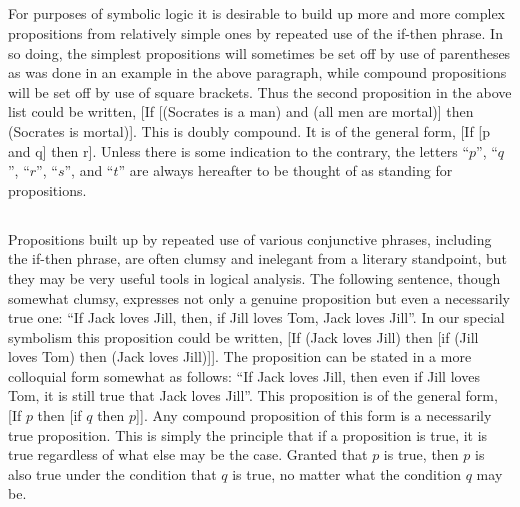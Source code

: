 \documentclass{book}
\begin{document}
\subsection{}
\label{sec:3.3}

For purposes of symbolic logic it is desirable to build up more and more complex propositions from relatively simple ones by repeated use of the if-then phrase.  In so doing, the simplest propositions will sometimes be set off by use of parentheses as was done in an example in the above paragraph, while compound propositions will be set off by use of square brackets.  Thus the second proposition in the above list could be written, [If [(Socrates is a man) and (all men are mortal)] then (Socrates is mortal)].  This is doubly compound.  It is of the general form, [If [p and q] then r].  Unless there is some indication to the contrary, the letters “\(p\)”, “\(q\)”, “\(r\)”, “\(s\)”, and “\(t\)” are always hereafter to be thought of as standing for propositions.

\subsection{}
\label{sec:3.4}

Propositions built up by repeated use of various conjunctive phrases, including the if-then phrase, are often clumsy and inelegant from a literary standpoint, but they may be very useful tools in logical analysis.  The following sentence, though somewhat clumsy, expresses not only a genuine proposition but even a necessarily true one: “If Jack loves Jill, then, if Jill loves Tom, Jack loves Jill”.  In our special symbolism this proposition could be written, [If (Jack loves Jill) then [if (Jill loves Tom) then (Jack loves Jill)]].  The proposition can be stated in a more colloquial form somewhat as follows: “If Jack loves Jill, then even if Jill loves Tom, it is still true that Jack loves Jill”.  This proposition is of the general form, [If \(p\) then [if \(q\) then \(p\)]].  Any compound proposition of this form is a necessarily true proposition.  This is simply the principle that if a proposition is true, it is true regardless of what else may be the case.  Granted that \(p\) is true, then \(p\) is also true under the condition that \(q\) is true, no matter what the condition \(q\) may be.

\subsection{}
\label{sec:3.5}
\end{document}
